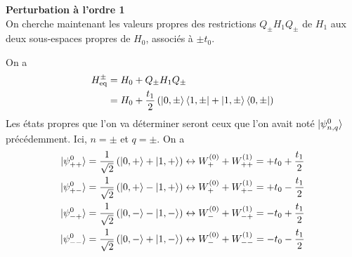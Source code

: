 \documentclass[11pt]{article}
\begin{document}
\textbf{Perturbation à l'ordre 1}\\
On cherche maintenant les valeurs propres des restrictions $Q_{\pm} H_1 Q_{\pm}$ de $H_1$ aux deux sous-espaces propres de $H_0$, associés à $\pm t_0$.

On a
\begin{align*}
	H^{\pm}_{\text{eq}} &= H_0 + Q_\pm H_1 Q_\pm \\
	&= H_0 + \frac{t_1}{2} \left( \ket{0,\pm}\bra{1,\pm} + \ket{1,\pm}\bra{0,\pm} \right)
\end{align*}
Les états propres que l'on va déterminer seront ceux que l'on avait noté $\ket{\psi^0_{n,q}}$ précédemment. Ici, $n=\pm$ et $q=\pm$. On a
\begin{align*}
	\ket{\psi^0_{++}} = \frac{1}{\sqrt{2}} \left( \ket{0,+} + \ket{1,+} \right) &\leftrightarrow W^{(0)}_{+} + W^{(1)}_{++} = +t_0 + \frac{t_1}{2} \\
	\ket{\psi^0_{+-}} = \frac{1}{\sqrt{2}} \left( \ket{0,+} - \ket{1,+} \right) &\leftrightarrow W^{(0)}_+ + W^{(1)}_{+-} = +t_0 - \frac{t_1}{2} \\
	\ket{\psi^0_{-+}} = \frac{1}{\sqrt{2}} \left( \ket{0,-} - \ket{1,-} \right) &\leftrightarrow W^{(0)}_- + W^{(1)}_{-+} = -t_0 + \frac{t_1}{2} \\
	\ket{\psi^0_{--}} = \frac{1}{\sqrt{2}} \left( \ket{0,-} + \ket{1,-} \right) &\leftrightarrow W^{(0)}_- + W^{(1)}_{--} = -t_0 - \frac{t_1}{2}
\end{align*}
\end{document}

